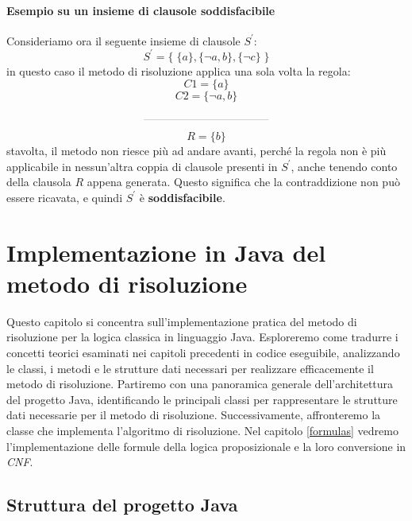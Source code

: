 \documentclass[a4paper,12pt]{report}
\begin{document}
\subsubsection{Esempio su un insieme di clausole soddisfacibile}
Consideriamo ora il seguente insieme di clausole $S^{'}$:
\[ S^{'} = \{ \; \{a\}, \{\lnot a, b\}, \{\lnot c\} \; \} \]
in questo caso il metodo di risoluzione applica una sola volta la regola:
\[ C1 = \{a\} \] \[ C2 = \{\lnot a, b\} \] \[ \rule{4cm}{0.2pt} \] \[R = \{b \}\]
stavolta, il metodo non riesce più ad andare avanti, perché la regola non è più applicabile in nessun'altra coppia di clausole presenti in $S^{'}$, anche tenendo conto della clausola $R$ appena generata. Questo significa che la contraddizione non può essere ricavata, e quindi $S^{'}$ è \textbf{soddisfacibile}.

% 
% 
\chapter{Implementazione in Java del metodo di risoluzione}
\label{impl}

Questo capitolo si concentra sull'implementazione pratica del metodo di risoluzione per la logica classica in linguaggio Java. Esploreremo come tradurre i concetti teorici esaminati nei capitoli precedenti in codice eseguibile, analizzando le classi, i metodi e le strutture dati necessari per realizzare efficacemente il metodo di risoluzione. Partiremo con una panoramica generale dell'architettura del progetto Java, identificando le principali classi per rappresentare le strutture dati necessarie per il metodo di risoluzione. Successivamente, affronteremo la classe che implementa l'algoritmo di risoluzione. Nel capitolo \ref{formulas} vedremo l'implementazione delle formule della logica proposizionale e la loro conversione in \textit{CNF}.

\section{Struttura del progetto Java}
\label{project_structure}
\end{document}
